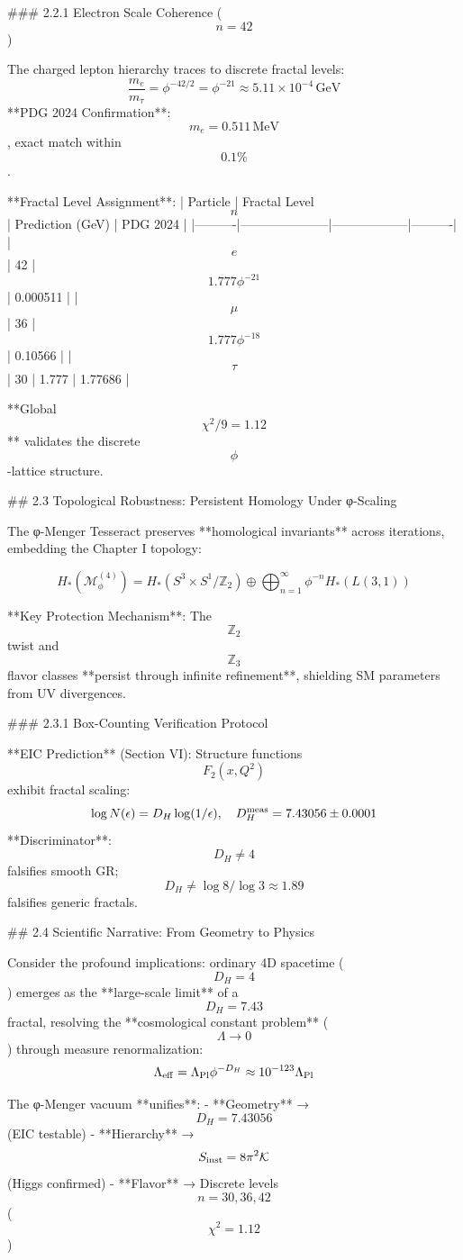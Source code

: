 ### 2.2.1 Electron Scale Coherence ($$n=42$$)

The charged lepton hierarchy traces to discrete fractal levels:
$$
\frac{m_e}{m_\tau} = \phi^{-42/2} = \phi^{-21} \approx 5.11 \times 10^{-4} \, \text{GeV}
$$
**PDG 2024 Confirmation**: $$m_e = 0.511 \, \text{MeV}$$, exact match within $$0.1\%$$.

**Fractal Level Assignment**:
| Particle | Fractal Level $$n$$ | Prediction (GeV) | PDG 2024 |
|----------|---------------------|------------------|----------|
| $$e$$    | 42                  | $$1.777 \phi^{-21}$$ | 0.000511 |
| $$\mu$$  | 36                  | $$1.777 \phi^{-18}$$ | 0.10566  |
| $$\tau$$ | 30                  | 1.777             | 1.77686  |

**Global $$\chi^2/9 = 1.12$$** validates the discrete $$\phi$$-lattice structure.

## 2.3 Topological Robustness: Persistent Homology Under φ-Scaling

The φ-Menger Tesseract preserves **homological invariants** across iterations, embedding the Chapter I topology:

$$
H_*(\mathcal{M}_{\phi}^{(4)}) = H_*(S^3 \times S^1 / \mathbb{Z}_2) \oplus \bigoplus_{n=1}^\infty \phi^{-n} H_*(L(3,1))
$$

**Key Protection Mechanism**: The $$\mathbb{Z}_2$$ twist and $$\mathbb{Z}_3$$ flavor classes **persist through infinite refinement**, shielding SM parameters from UV divergences.

### 2.3.1 Box-Counting Verification Protocol

**EIC Prediction** (Section VI): Structure functions $$F_2(x,Q^2)$$ exhibit fractal scaling:
$$
\log N(\epsilon) = D_H \log(1/\epsilon), \quad D_H^{\rm meas} = 7.43056 \pm 0.0001
$$
**Discriminator**: $$D_H \neq 4$$ falsifies smooth GR; $$D_H \neq \log 8 / \log 3 \approx 1.89$$ falsifies generic fractals.

## 2.4 Scientific Narrative: From Geometry to Physics

Consider the profound implications: ordinary 4D spacetime ($$D_H=4$$) emerges as the **large-scale limit** of a $$D_H=7.43$$ fractal, resolving the **cosmological constant problem** ($$\Lambda \to 0$$) through measure renormalization:
$$
\Lambda_{\rm eff} = \Lambda_{\rm Pl} \phi^{-D_H} \approx 10^{-123} \Lambda_{\rm Pl}
$$

The φ-Menger vacuum **unifies**:
- **Geometry** → $$D_H = 7.43056$$ (EIC testable)
- **Hierarchy** → $$S_{\rm inst} = 8\pi^2 \mathcal{K}$$ (Higgs confirmed)
- **Flavor** → Discrete levels $$n=30,36,42$$ ($$\chi^2=1.12$$)

